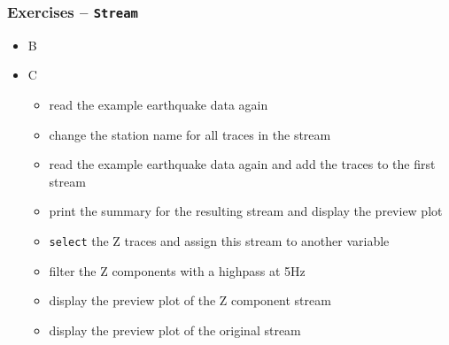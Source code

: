 \documentclass[t,10pt,compress=false,usepdftitle=false]{beamer}
\begin{document}
\begin{frame}[fragile]
    \frametitle{Exercises -- \tt{Stream}}
    \begin{itemize}
    \item B
    \end{itemize}
    \begin{itemize}
    \item C
        \begin{itemize}
        \item read the example earthquake data again
        \item change the station name for all traces in the stream
        \item read the example earthquake data again and add the traces to the first stream
        \item print the summary for the resulting stream and display the preview plot
        \item \verb#select# the Z traces and assign this stream to another variable
        \item filter the Z components with a highpass at 5Hz
        \item display the preview plot of the Z component stream
        \item display the preview plot of the original stream
        \end{itemize}
    \end{itemize}
\end{frame}
\end{document}
